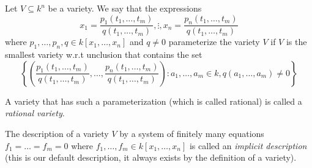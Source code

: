 \begin{definition}[title = Definition 1.3.6]
  Let $V \subseteq k^n$ be a variety. We say that the expressions 
  \[
    x_1 = \frac{p_1(t_1, \ldots, t_m)}{q(t_1, \ldots, t_m)} , 
    \vdots , 
    x_n = \frac{p_n(t_1, \ldots, t_m)}{q(t_1, \ldots, t_m)}
  \]
  where $p_1, \ldots, p_n, q \in k[x_1, \dots, x_n] $ and $q \neq 0$ parameterize the variety $V$ if $V$ is the smallest variety w.r.t unclusion that contains the set 
  \[\left\{\left( \frac{p_1(t_1, \ldots, t_m)}{q(t_1, \ldots, t_m)}, \ldots, \frac{p_n(t_1, \ldots, t_m)}{q(t_1, \ldots, t_m)} \right): a_1, \ldots, a_m \in k, q(a_1, \ldots, a_m) \neq 0 \right\}\] 

  A variety that has such a parameterization (which is called rational) is called a \textit{rational variety}.
\end{definition} 

\begin{definition}[title = Definition 1.3.7]
  The description of a variety $V$ by a system of finitely many equations $f_1 = \ldots = f_m = 0$ where $f_1, \ldots, f_m \in k[x_1, \dots, x_n]$ is called an 
  \textit{implicit description} (this is our default description, it always exists by the definition of a variety).
  \begin{center}
  \end{center}
\end{definition} 

